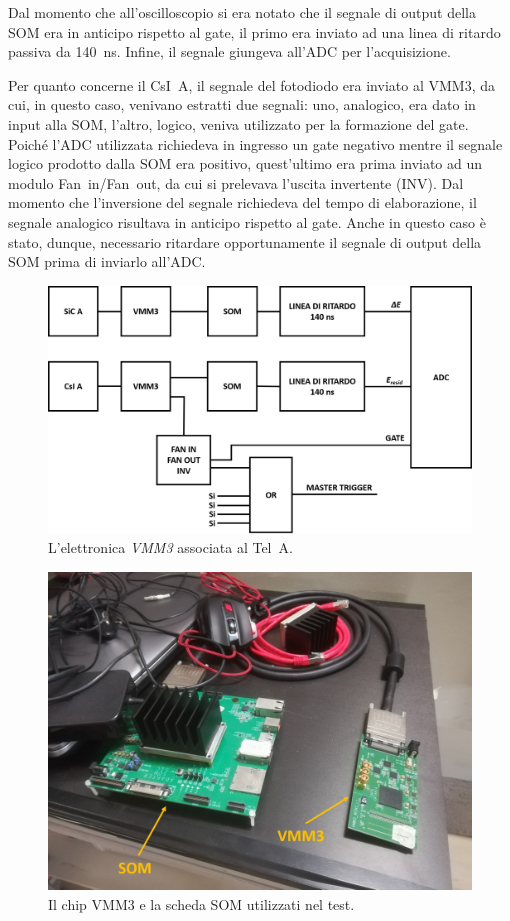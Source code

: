 Dal momento che all'oscilloscopio si era notato che il segnale di output della SOM era in anticipo rispetto al gate, il primo era inviato ad una linea di ritardo passiva da 140~ns. Infine, il segnale giungeva all'ADC per l'acquisizione.


Per quanto concerne il CsI~A, il segnale del fotodiodo era inviato al VMM3, da cui, in questo caso, venivano estratti due segnali: uno, analogico, era dato in input alla SOM, l'altro, logico, veniva utilizzato per la formazione del gate. 
Poiché l'ADC utilizzata richiedeva in ingresso un gate negativo mentre il segnale logico prodotto dalla SOM era positivo, quest'ultimo era prima inviato ad un modulo Fan~in/Fan~out, da cui si prelevava l'uscita invertente (INV).
Dal momento che l'inversione del segnale richiedeva del tempo di elaborazione, il segnale analogico risultava in anticipo rispetto al gate. Anche in questo caso è stato, dunque, necessario ritardare opportunamente il segnale di output della SOM prima di inviarlo all'ADC.


\begin{figure} [!p]
	\centering
	\includegraphics[width=\textwidth, keepaspectratio]{Grafici/elettronica_vmm.png}
	\caption{L'elettronica \emph{VMM3} associata al Tel~A.} \label{fig:elettronica_vmm}
\end{figure}

\begin{figure} [!p]
	\centering
	\includegraphics[width=\textwidth, keepaspectratio]{Grafici/vmm_som_etichette.png}
	\caption{Il chip VMM3 e la scheda SOM utilizzati nel test.} \label{fig:vmm+som}
\end{figure}